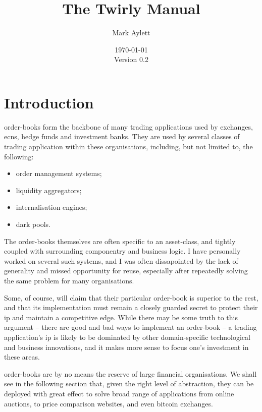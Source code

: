\documentclass[11pt,a4paper]{article}
\begin{document}
\title{The Twirly Manual}
\author{Mark Aylett}
\date{\today\\Version 0.2}
\maketitle

\tableofcontents

\section{Introduction}

\Glspl{order-book} form the backbone of many trading applications used by \glspl{exchange},
\glspl{ecn}, hedge funds and investment banks. They are used by several classes of trading
application within these organisations, including, but not limited to, the following:

\begin{itemize}
\item order management systems;
\item liquidity aggregators;
\item internalisation engines;
\item dark pools.
\end{itemize}

The \glspl{order-book} themselves are often specific to an \gls{asset}-class, and tightly coupled
with surrounding componentry and business logic. I have personally worked on several such systems,
and I was often dissapointed by the lack of generality and missed opportunity for reuse, especially
after repeatedly solving the same problem for many organisations.

Some, of course, will claim that their particular \gls{order-book} is superior to the rest, and that
its implementation must remain a closely guarded secret to protect their \gls{ip} and maintain a
competitive edge. While there may be some truth to this argument -- there are good and bad ways to
implement an \gls{order-book} -- a trading application's \gls{ip} is likely to be dominated by other
domain-specific technological and business innovations, and it makes more sense to focus one's
investment in these areas.

\Glspl{order-book} are by no means the reserve of large financial organisations. We shall see in the
following section that, given the right level of abstraction, they can be deployed with great effect
to solve broad range of applications from online \glspl{auction}, to price comparison websites, and
even \gls{bitcoin} \glspl{exchange}.
\end{document}
